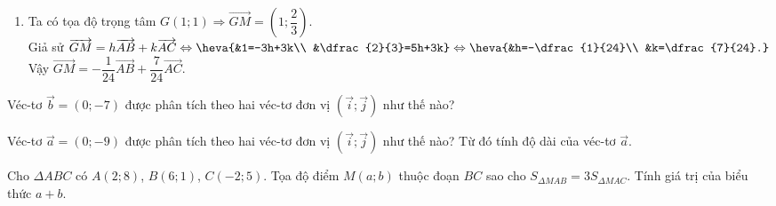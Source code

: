 \begin{bt}
{\begin{enumerate}
			\item Ta có tọa độ trọng tâm $G(1;1) \Rightarrow \overrightarrow{GM}=\left(1;\dfrac{2}{3}\right)$.\\
			Giả sử $\overrightarrow{GM}=h\overrightarrow{AB}+k\overrightarrow{AC} \Leftrightarrow \heva{&1=-3h+3k\\ &\dfrac{2}{3}=5h+3k} \Leftrightarrow \heva{&h=-\dfrac{1}{24}\\ &k=\dfrac{7}{24}.}$\\
			Vậy $\overrightarrow{GM}=-\dfrac{1}{24}\overrightarrow{AB}+\dfrac{7}{24}\overrightarrow{AC}$.
		\end{enumerate}
	}
\end{bt}

\begin{bt}%
	Véc-tơ $\overrightarrow{b}=(0;-7)$ được phân tích theo hai véc-tơ đơn vị $\left(\overrightarrow{i};\overrightarrow{j}\right)$ như thế nào?
\end{bt}

\begin{bt}%
	Véc-tơ $\overrightarrow{a}=(0;-9)$ được phân tích theo hai véc-tơ đơn vị $\left(\overrightarrow{i};\overrightarrow{j}\right)$ như thế nào? Từ đó tính độ dài của véc-tơ $\overrightarrow{a}$.
\end{bt}

\begin{bt}%
	Cho $\Delta ABC$ có $A(2; 8)$, $B(6; 1)$, $C(-2; 5)$. Tọa độ điểm $M(a;b)$ thuộc đoạn $BC$ sao cho $S_{\Delta MAB}=3S_{\Delta MAC}$. Tính giá trị của biểu thức $a+b$.
\end{bt}

